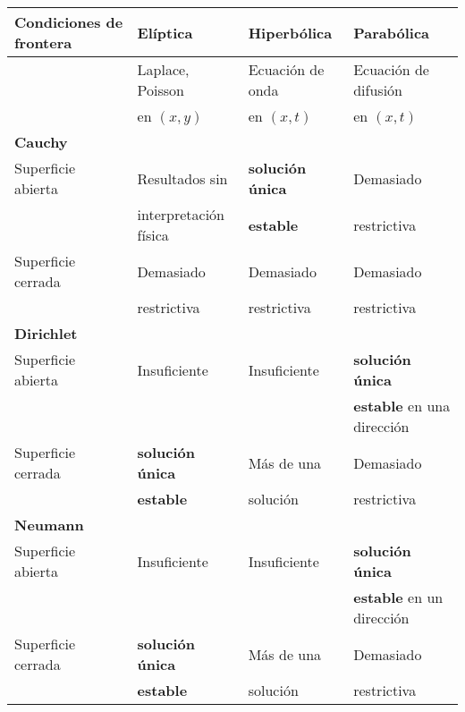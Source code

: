 \begin{center}
\fontsize{12}{12}\selectfont
\begin{tabular}{ l l l l} \hline
Condiciones de frontera & Elíptica & Hiperbólica & Parabólica \\ \hline
 & Laplace, Poisson & Ecuación de onda & Ecuación de difusión \\
 & en $(x,y)$  &  en $(x,t)$ &  en $(x,t)$ \\ 
\textbf{Cauchy} & & & \\ \hline
Superficie abierta & Resultados sin & \textbf{solución única}  & Demasiado \\ 
 & interpretación física & \textbf{estable} & restrictiva \\ 
Superficie cerrada & Demasiado & Demasiado & Demasiado \\
 & restrictiva & restrictiva & restrictiva \\
\textbf{Dirichlet} & & & \\ \hline
Superficie abierta & Insuficiente & Insuficiente  & \textbf{solución única} \\ 
 & & & \textbf{estable} en una dirección \\ 
Superficie cerrada & \textbf{solución única} & Más de una & Demasiado \\
 & \textbf{estable} & solución & restrictiva \\
 \textbf{Neumann} & & & \\ \hline
Superficie abierta & Insuficiente & Insuficiente  & \textbf{solución única} \\ 
 & & & \textbf{estable} en un dirección \\ 
Superficie cerrada & \textbf{solución única} & Más de una & Demasiado \\
 & \textbf{estable} & solución & restrictiva \\
\end{tabular}
\end{center}
\fontsize{14}{14}\selectfont
